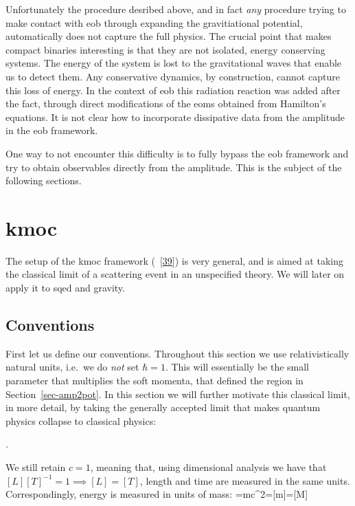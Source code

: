\documentclass[
  10pt,
  a4paper,
  DIV=11,
  numbers=noendperiod,
  twoside]{scrreprt}
\let\[\relax \let\]\relax %
\DeclareRobustCommand{\[}{\begin{equation}}
\DeclareRobustCommand{\]}{\end{equation}}
\begin{document}
Unfortunately the procedure desribed above, and in fact \emph{any}
procedure trying to make contact with \gls{eob} through expanding the
gravitiational potential, automatically does not capture the full
physics. The crucial point that makes compact binaries interesting is
that they are not isolated, energy conserving systems. The energy of the
system is lost to the gravitational waves that enable us to detect them.
Any conservative dynamics, by construction, cannot capture this loss of
energy. In the context of \gls{eob} this radiation reaction was added
after the fact, through direct modifications of the \gls{eom}s obtained
from Hamilton's equations. It is not clear how to incorporate
dissipative data from the amplitude in the \gls{eob} framework.

One way to not encounter this difficulty is to fully bypass the
\gls{eob} framework and try to obtain observables directly from the
amplitude. This is the subject of the following sections.

\hypertarget{sec-kmoc}{%
\section{\texorpdfstring{\gls{kmoc}}{}}\label{sec-kmoc}}

The setup of the \gls{kmoc} framework
(~{[}\protect\hyperlink{ref-Kosower:2018adc}{39}{]}) is very general,
and is aimed at taking the classical limit of a scattering event in an
unspecified theory. We will later on apply it to \gls{sqed} and gravity.

\hypertarget{conventions}{%
\subsection{Conventions}\label{conventions}}

First let us define our conventions. Throughout this section we use
relativistically natural units, i.e.~we do \emph{not} set \(\hbar=1\).
This will essentially be the small parameter that multiplies the soft
momenta, that defined the region in Section~\ref{sec-amp2pot}. In this
section we will further motivate this classical limit, in more detail,
by taking the generally accepted limit that makes quantum physics
collapse to classical physics:

\[\hbar{}.\]

We still retain \(c=1\), meaning that, using dimensional analysis we
have that \([L][T]^{-1}=1 \implies [L]=[T]\), length and time are
measured in the same units. Correspondingly, energy is measured in units
of mass: \[
\energy=mc^2\implies[\energy]=[m]=[M]
\]
\end{document}
